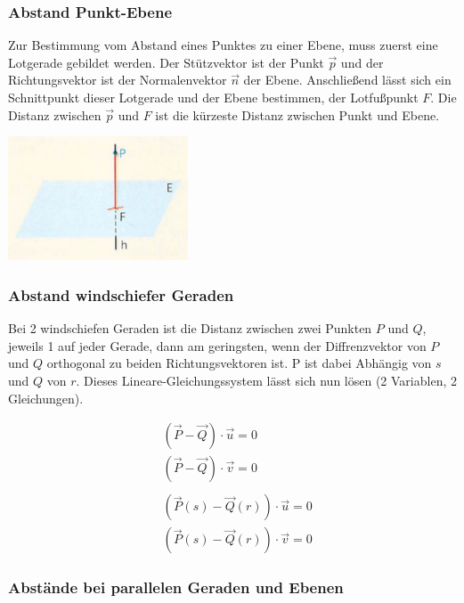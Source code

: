 \subsubsection{Abstand Punkt-Ebene}

Zur Bestimmung vom Abstand eines Punktes zu einer Ebene, muss zuerst
eine Lotgerade gebildet werden. Der Stützvektor ist der Punkt $\vec{p}$
und der Richtungsvektor ist der Normalenvektor $\vec{n}$ der Ebene.
Anschließend lässt sich ein Schnittpunkt dieser Lotgerade und der Ebene
bestimmen, der Lotfußpunkt $F$. Die Distanz zwischen $\vec{p}$ und $F$ ist
die kürzeste Distanz zwischen Punkt und Ebene.

\begin{center}
    \includegraphics[width=0.4\textwidth]{images/3d-point-plane-distance.png}
\end{center}

\subsubsection{Abstand windschiefer Geraden}

Bei 2 windschiefen Geraden ist die Distanz zwischen zwei Punkten $P$ und $Q$,
jeweils 1 auf jeder Gerade, dann am geringsten, wenn der Diffrenzvektor von $P$ und $Q$
orthogonal zu beiden Richtungsvektoren ist. P ist dabei Abhängig von $s$ und $Q$ von $r$.
Dieses Lineare-Gleichungssystem lässt sich nun lösen (2 Variablen, 2 Gleichungen).

\begin{align*}
    & (\vec{P} - \vec{Q}) \cdot \vec{u} = 0 \\
    & (\vec{P} - \vec{Q}) \cdot \vec{v} = 0 \\
    \\
    & (\vec{P}(s) - \vec{Q}(r)) \cdot \vec{u} = 0 \\
    & (\vec{P}(s) - \vec{Q}(r)) \cdot \vec{v} = 0
\end{align*}

\clearpage

\subsubsection{Abstände bei parallelen Geraden und Ebenen}

